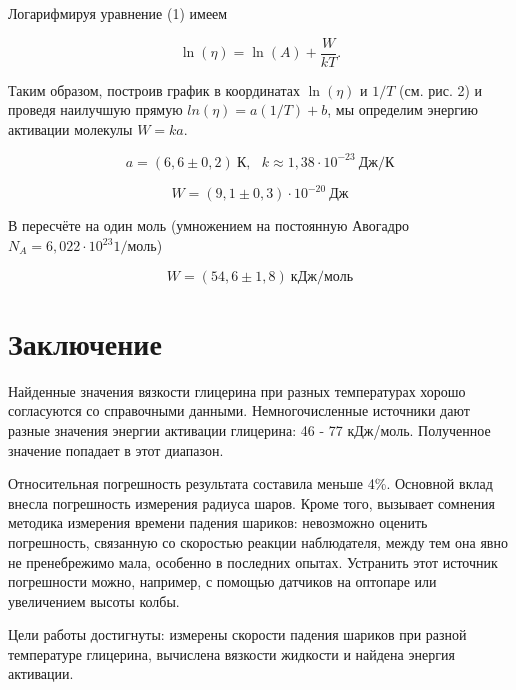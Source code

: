 \documentclass{article}
\begin{document}
	\hspace{4mm} Логарифмируя уравнение (1) имеем
	
	\begin{equation}
		\ln(\eta) = \ln(A) + \frac{W}{kT}.
	\end{equation}
	
	Таким образом, построив график в координатах $\ln(\eta)$ и $1/T$ (см. рис. 2) и проведя наилучшую прямую $ln(\eta) = a(1/T) + b$, мы определим энергию активации молекулы $W = ka$.
	
	
	\begin{equation*}
		a = (6,6 \pm 0,2) \ К, \ \ \ k \approx 1,38 \cdot 10^{-23} \ Дж/К
	\end{equation*}
	
	\begin{equation*}
		W = (9,1 \pm 0,3) \cdot 10^{-20} \ Дж
	\end{equation*}
	
	В пересчёте на один моль (умножением на постоянную Авогадро $N_A = 6,022 \cdot 10^{23} 1/моль$)
	
	\begin{equation*}
		\boxed{W = (54,6 \pm 1,8)  \ кДж/моль}
	\end{equation*}

	
\section*{Заключение}

	\hspace{4mm} Найденные значения вязкости глицерина при разных температурах хорошо согласуются со справочными данными. Немногочисленные источники дают разные значения энергии активации глицерина: 46 - 77 кДж/моль. Полученное значение попадает в этот диапазон.
	
	Относительная погрешность результата составила меньше 4\%. Основной вклад внесла погрешность измерения радиуса шаров. Кроме того, вызывает сомнения методика измерения времени падения шариков: невозможно оценить погрешность, связанную со скоростью реакции наблюдателя, между тем она явно не пренебрежимо мала, особенно в последних опытах. Устранить этот источник погрешности можно, например, с помощью датчиков на оптопаре или увеличением высоты колбы.
	
	Цели работы достигнуты: измерены скорости падения шариков при разной температуре глицерина, вычислена вязкости жидкости и найдена энергия активации.
	
		
\end{document}
